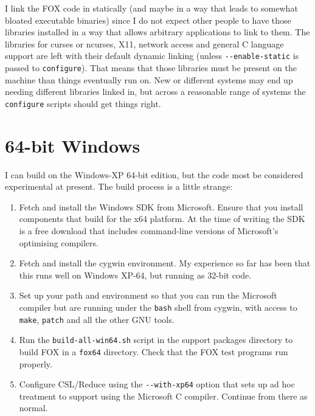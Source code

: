 \documentclass[11pt]{article}
\begin{document}
I link the FOX code in statically (and maybe in a way that leads
to somewhat bloated executable binaries) since I do not expect other
people to have those libraries installed in a way that allows arbitrary
applications to link to them. The libraries for curses or ncurses, X11,
network access and general C language support are left with their default
dynamic linking (unless \verb+--enable-static+ is passed to \verb+configure+).
That means that those libraries must be present on the machine than things
eventually run on. New or different systems may end up needing different
libraries linked in, but across a reasonable range of systems the
\verb+configure+ scripts should get things right.

\section{64-bit Windows}
I can build on the Windows-XP 64-bit edition, but the code most be considered
experimental at present. The build process is a little strange:
\begin{enumerate}
\item Fetch and install the Windows SDK from Microsoft. Ensure that you
install components that build for the x64 platform. At the time of writing the
SDK is a free download that includes command-line versions of Microsoft's
optimising compilers.
\item Fetch and install the cygwin environment. My experience so far has been
that this runs well on Windows XP-64, but running as 32-bit code.
\item Set up your path and environment so that you can run the Microsoft
compiler but are running under the \verb.bash. shell from cygwin, with access
to \verb.make., \verb.patch. and all the other GNU tools.
\item Run the \verb+build-all-win64.sh+ script in the support packages
directory to build FOX in a \verb.fox64. directory. Check that the FOX
test programs run properly.
\item Configure CSL/Reduce using the \verb.--with-xp64. option that sets up
ad hoc treatment to support using the Microsoft C compiler. Continue
from there as normal.
\end{enumerate}
\end{document}
